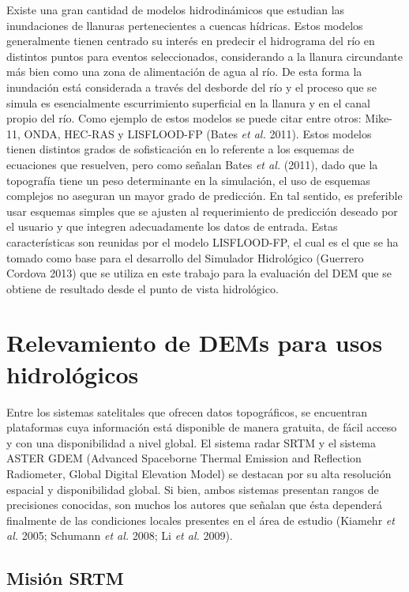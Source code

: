 \documentclass[10pt,a4paper, twoside]{report}
\begin{document}
Existe una gran cantidad de modelos hidrodinámicos que estudian las inundaciones de llanuras pertenecientes a cuencas hídricas. Estos modelos generalmente tienen centrado su interés en predecir el hidrograma del río en distintos puntos para eventos seleccionados, considerando a la llanura circundante más bien como una zona de alimentación de agua al río. De esta forma la inundación está considerada a través del desborde del río y el proceso que se simula es esencialmente escurrimiento superficial en la llanura y en el canal propio del río. Como ejemplo de estos modelos se puede citar entre otros: Mike-11, ONDA, HEC-RAS y LISFLOOD-FP (Bates \textit{et al.} 2011). Estos modelos tienen distintos grados de sofisticación en lo referente a los esquemas de ecuaciones que resuelven, pero como señalan Bates \textit{et al.} (2011), dado que la topografía tiene un peso determinante en la simulación, el uso de esquemas complejos no aseguran un mayor grado de predicción. En tal sentido, es preferible usar esquemas simples que se ajusten al requerimiento de predicción deseado por el usuario y que integren adecuadamente los datos de entrada. Estas características son reunidas por el modelo LISFLOOD-FP, el cual es el que se ha tomado como base para el desarrollo del Simulador Hidrológico (Guerrero Cordova 2013) que se utiliza en este trabajo para la evaluación del DEM que se obtiene de resultado desde el punto de vista hidrológico.


\section{Relevamiento de DEMs para usos hidrológicos}


Entre los sistemas satelitales que ofrecen datos topográficos, se encuentran plataformas cuya información está disponible de manera gratuita, de fácil acceso y con una disponibilidad a nivel global. El sistema radar SRTM y el sistema ASTER GDEM (Advanced Spaceborne Thermal Emission and Reflection Radiometer, Global Digital Elevation Model) se destacan por su alta resolución espacial y disponibilidad global. Si bien, ambos sistemas presentan rangos de precisiones conocidas, son muchos los autores que señalan que ésta dependerá finalmente de las condiciones locales presentes en el área de estudio (Kiamehr \textit{et al.} 2005; Schumann \textit{et al.} 2008; Li \textit{et al.} 2009).

\subsection{Misión SRTM}
\end{document}
